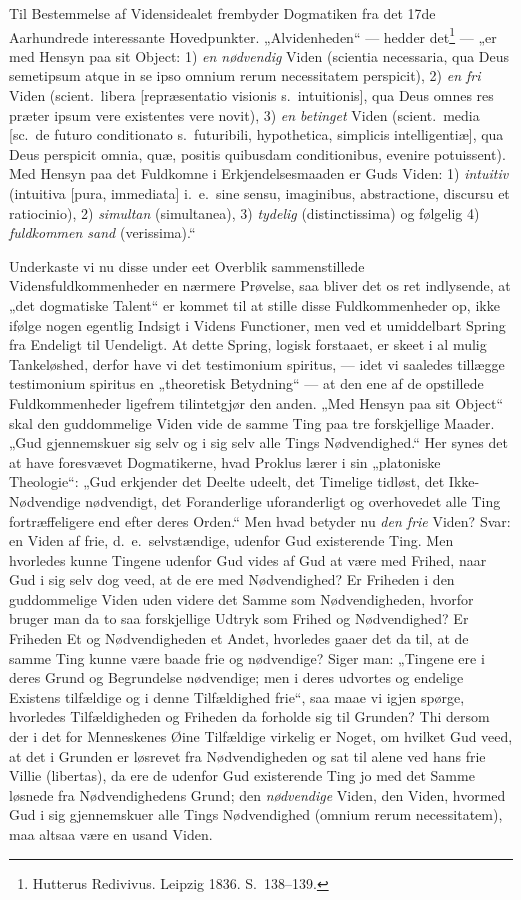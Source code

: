 \documentclass[12pt]{book}
\newcommand{\opage}[1]{\marginnote{\footnotesize\textit{[#1]}}}
\begin{document}
Til Bestemmelse af Vidensidealet frembyder Dogmatiken fra det 17de Aarhundrede interessante
Hovedpunkter. „Alvidenheden“ --- hedder det\footnote{Hutterus Redivivus. Leipzig 1836. S.~138--139.}
--- „er med Hensyn paa sit Object: 1) \emph{en nødvendig} Viden (scientia necessaria, qua Deus
semetipsum atque in se ipso omnium rerum necessitatem perspicit), 2) \emph{en fri} Viden (scient.\
libera [repræsentatio visionis s.\ intuitionis], qua Deus omnes res præter ipsum vere existentes
vere novit), 3) \emph{en betinget}
\opage{235} Viden (scient.\ media [sc.\ de futuro conditionato s.\ futuribili, hypothetica, simplicis
intelligentiæ], qua Deus perspicit omnia, quæ, positis quibusdam conditionibus, evenire
potuissent). Med Hensyn paa det Fuldkomne i Erkjendelsesmaaden er Guds Viden: 1) \emph{intuitiv}
(intuitiva [pura, immediata] i.\ e.\ sine sensu, imaginibus, abstractione, discursu et ratiocinio),
2) \emph{simultan} (simultanea), 3) \emph{tydelig} (distinctissima) og følgelig 4) \emph{fuldkommen
sand} (verissima).“

Underkaste vi nu disse under eet Overblik sammenstillede Vidensfuldkommenheder en nærmere Prøvelse,
saa bliver det os ret indlysende, at „det dogmatiske Talent“ er kommet til at stille disse
Fuldkommenheder op, ikke ifølge nogen egentlig Indsigt i Videns Functioner, men ved et umiddelbart
Spring fra Endeligt til Uendeligt. At dette Spring, logisk forstaaet, er skeet i al mulig
Tankeløshed, derfor have vi det testimonium spiritus, --- idet vi saaledes tillægge testimonium
spiritus en „theoretisk Betydning“ --- at den ene af de opstillede Fuldkommenheder ligefrem
tilintetgjør den anden. „Med Hensyn paa sit Object“ skal den guddommelige Viden vide de samme Ting
paa tre forskjellige Maader. „Gud gjennemskuer sig selv og i sig selv alle Tings Nødvendighed.“ Her
synes det at have foresvævet Dogmatikerne, hvad Proklus lærer i sin „platoniske Theologie“: „Gud
erkjender det Deelte udeelt, det Timelige tidløst, det Ikke-Nødvendige nødvendigt, det Foranderlige
uforanderligt og overhovedet alle Ting fortræffeligere end efter deres Orden.“ Men hvad betyder nu
\emph{den frie} Viden? Svar: en Viden af frie, d.\ e.\ selvstændige, udenfor Gud existerende Ting.
Men hvorledes kunne Tingene udenfor Gud vides af Gud at være med Frihed, naar Gud i sig selv dog
veed, at de ere med Nødvendighed? Er Friheden i den guddommelige Viden uden videre det Samme som
Nødvendigheden, hvorfor bruger man da to saa forskjellige Udtryk som Frihed og Nødvendighed? Er
Friheden Et og
\opage{236} Nødvendigheden et Andet, hvorledes gaaer det da til, at de samme Ting kunne være baade frie og
nødvendige? Siger man: „Tingene ere i deres Grund og Begrundelse nødvendige; men i deres udvortes
og endelige Existens tilfældige og i denne Tilfældighed frie“, saa maae vi igjen spørge, hvorledes
Tilfældigheden og Friheden da forholde sig til Grunden? Thi dersom der i det for Menneskenes Øine
Tilfældige virkelig er Noget, om hvilket Gud veed, at det i Grunden er løsrevet fra Nødvendigheden
og sat til alene ved hans frie Villie (libertas), da ere de udenfor Gud existerende Ting jo med det
Samme løsnede fra Nødvendighedens Grund; den \emph{nødvendige} Viden, den Viden, hvormed Gud i sig
gjennemskuer alle Tings Nødvendighed (omnium rerum necessitatem), maa altsaa være en usand Viden.
\end{document}
